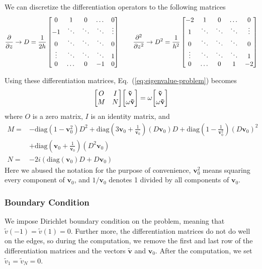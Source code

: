 We can discretize the differentiation operators to the following matrices
\[
	\pdv{z} \rightarrow D = \frac{1}{2h}\begin{bmatrix}
		0      & 1      & 0      & \dots  & 0      \\
		-1     & \ddots & \ddots & \ddots & \vdots \\
		0      & \ddots & \ddots & \ddots & 0      \\
		\vdots & \ddots & \ddots & \ddots & 1      \\
		0      & \dots  & 0      & -1     & 0
	\end{bmatrix}
	\qquad
	\pdv[2]{z} \rightarrow  D^2 = \frac{1}{h^2}\begin{bmatrix}
		-2     & 1      & 0      & \dots  & 0      \\
		1      & \ddots & \ddots & \ddots & \vdots \\
		0      & \ddots & \ddots & \ddots & 0      \\
		\vdots & \ddots & \ddots & \ddots & 1      \\
		0      & \dots  & 0      & 1      & -2
	\end{bmatrix}
\]

Using these differentiation matrices, Eq.~(\ref{eq:eigenvalue-problem}) becomes
\begin{equation}
	\mqty[ O & I\\ M & N ]\mqty[ \mathbf{\tilde{v}}\\ \omega\mathbf{\tilde{v}} ] = \omega\mqty[ \mathbf{\tilde{v}}\\ \omega\mathbf{\tilde{v}} ]
\end{equation}
where $O$ is a zero matrix, $I$ is an identity matrix, and
\begin{align*}
	M = & -\text{diag}(1-\mathbf{v}_0^2)D^2
	+\text{diag}\left(3\mathbf{v}_0 + \frac{1}{\mathbf{v}_0}\right) (D\mathbf{v}_0)D
	+\text{diag}\left(1-\frac{1}{\mathbf{v}_0^2}\right)\left(D\mathbf{v}_0\right)^2     \\
	    & +\text{diag}\left(\mathbf{v}_0+\frac{1}{\mathbf{v}_0}\right)(D^2\mathbf{v}_0) \\
	N = & -2i\left(\text{diag}(\mathbf{v}_0)D + D\mathbf{v}_0 \right)
\end{align*}
Here we abused the notation for the purpose of convenience, $\mathbf{v}_0^2$ means squaring every component of $\mathbf{v}_0$, and $1/\mathbf{v}_0$ denotes 1 divided by all components of $\mathbf{v}_0$.

\subsubsection{Boundary Condition}
We impose Dirichlet boundary condition on the problem, meaning that $\tilde{v}(-1)=\tilde{v}(1)=0$. Further more, the differentiation matrices do not do well on the edges, so during the computation, we remove the first and last row of the differentiation matrices and the vectors $\mathbf{\tilde{v}}$ and $\mathbf{v}_0$. After the computation, we set $\tilde{v}_1=\tilde{v}_N = 0$.

